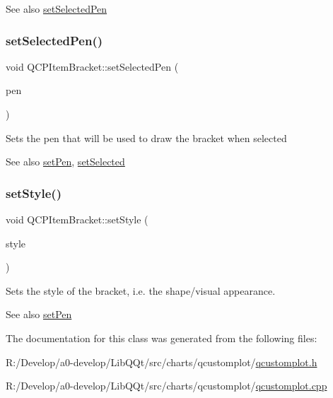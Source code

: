 \begin{DoxySeeAlso}{See also}
\mbox{\hyperlink{class_q_c_p_item_bracket_a349785c31122778a520c64891fa204c5}{set\+Selected\+Pen}} 
\end{DoxySeeAlso}
\mbox{\label{class_q_c_p_item_bracket_a349785c31122778a520c64891fa204c5}} 
\subsubsection{\texorpdfstring{set\+Selected\+Pen()}{setSelectedPen()}}
{\footnotesize\ttfamily void Q\+C\+P\+Item\+Bracket\+::set\+Selected\+Pen (\begin{DoxyParamCaption}\item[{const Q\+Pen \&}]{pen }\end{DoxyParamCaption})}

Sets the pen that will be used to draw the bracket when selected

\begin{DoxySeeAlso}{See also}
\mbox{\hyperlink{class_q_c_p_item_bracket_ab13001d9cc5d8f9e56ea15bdda682acb}{set\+Pen}}, \mbox{\hyperlink{class_q_c_p_abstract_item_a203de94ad586cc44d16c9565f49d3378}{set\+Selected}} 
\end{DoxySeeAlso}
\mbox{\label{class_q_c_p_item_bracket_a612dffa2373422eef8754d690add3703}} 
\subsubsection{\texorpdfstring{set\+Style()}{setStyle()}}
{\footnotesize\ttfamily void Q\+C\+P\+Item\+Bracket\+::set\+Style (\begin{DoxyParamCaption}\item[{\mbox{\hyperlink{class_q_c_p_item_bracket_a7ac3afd0b24a607054e7212047d59dbd}{Q\+C\+P\+Item\+Bracket\+::\+Bracket\+Style}}}]{style }\end{DoxyParamCaption})}

Sets the style of the bracket, i.\+e. the shape/visual appearance.

\begin{DoxySeeAlso}{See also}
\mbox{\hyperlink{class_q_c_p_item_bracket_ab13001d9cc5d8f9e56ea15bdda682acb}{set\+Pen}} 
\end{DoxySeeAlso}


The documentation for this class was generated from the following files\+:\begin{DoxyCompactItemize}
\item 
R\+:/\+Develop/a0-\/develop/\+Lib\+Q\+Qt/src/charts/qcustomplot/\mbox{\hyperlink{qcustomplot_8h}{qcustomplot.\+h}}\item 
R\+:/\+Develop/a0-\/develop/\+Lib\+Q\+Qt/src/charts/qcustomplot/\mbox{\hyperlink{qcustomplot_8cpp}{qcustomplot.\+cpp}}\end{DoxyCompactItemize}
